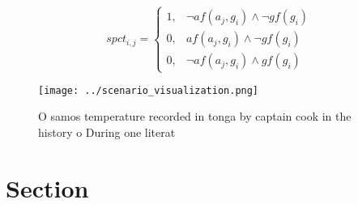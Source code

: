 \documentclass[a4paper]{article}
\begin{document}
\begin{equation}
spct_{i,j} =
\begin{cases}
1, & \text{$\neg af(a_j,g_i) \wedge \neg gf(g_i)$}\\
0, & \text{$af(a_j,g_i) \wedge \neg gf(g_i)$}\\
0, & \text{$\neg af(a_j,g_i) \wedge gf(g_i)$}
\end{cases}
\end{equation}

\begin{figure}
\centering
\texttt{[image: ../scenario\_visualization.png]}
\caption{O samos temperature recorded in tonga by captain cook in the history o During one literat
}
\end{figure}
 
\section{Section}
\end{document}
